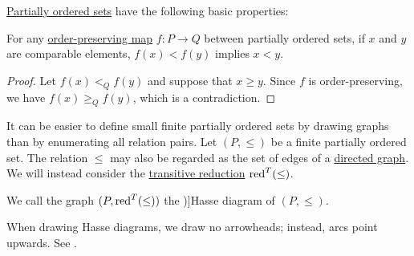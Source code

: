 \begin{proposition}\label{thm:def:partially_ordered_set}
  \hyperref[def:partially_ordered_set]{Partially ordered sets} have the following basic properties:
  \begin{thmenum}
     For any \hyperref[def:order_function/preserving]{order-preserving map} \( f: P \to Q \) between partially ordered sets, if \( x \) and \( y \) are comparable elements, \( f(x) < f(y) \) implies \( x < y \).
  \end{thmenum}
\end{proposition}
\begin{proof}
   Let \( f(x) <_Q f(y) \) and suppose that \( x \geq y \). Since \( f \) is order-preserving, we have \( f(x) \geq_Q f(y) \), which is a contradiction.
\end{proof}

\begin{definition}\label{def:hasse_diagram}
  It can be easier to define small finite partially ordered sets by drawing graphs than by enumerating all relation pairs. Let \( (P, \leq) \) be a finite partially ordered set. The relation \( \leq \) may also be regarded as the set of edges of a \hyperref[def:directed_graph]{directed graph}. We will instead consider the \hyperref[def:transitive_reduction]{transitive reduction} \( \operatorname{red}^T(\leq) \).

  We call the graph \( (P, \operatorname{red}^T(\leq)) \) the \term[ru=диаграмма Хассе (\cite[78]{Гуров2013ТеорияРешёток})]{Hasse diagram} of \( (P, \leq) \).
\end{definition}
\begin{comments}
  \item When drawing Hasse diagrams, we draw no arrowheads; instead, arcs point upwards. See .
\end{comments}


